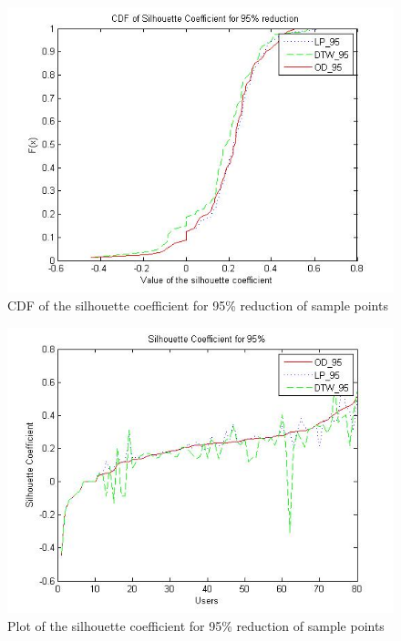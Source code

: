 \begin{itemize}
\begin{figure}
\centering     
\includegraphics[scale=0.3]{figs/noise_95_cdf.jpg}
\caption{CDF of the silhouette coefficient for 95\% reduction of sample points }
\label{fig:noise_95_cdf}  
\end{figure}

\begin{figure}
\centering     
\includegraphics[scale=0.3]{figs/noise_95_sil.jpg}
\caption{Plot of the silhouette coefficient for 95\% reduction of sample points }
\label{fig:noise_95_sil}  
\end{figure}


\end{itemize}

